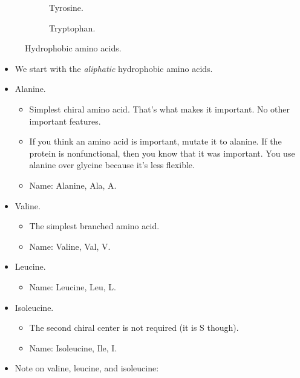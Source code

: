 \documentclass[../notes.tex]{subfiles}
\begin{document}
\begin{itemize}
\begin{figure}[H]
\begin{subfigure}[b]{0.3\linewidth}
            \caption{Tyrosine.}
            \label{fig:AAachiralT}
        \end{subfigure}
        \begin{subfigure}[b]{0.25\linewidth}
            \centering
            \caption{Tryptophan.}
            \label{fig:AAachiralW}
        \end{subfigure}
        \caption{Hydrophobic amino acids.}
        \label{fig:AAhydrophobic}
    \end{figure}
    \begin{itemize}
        \item We start with the \emph{aliphatic} hydrophobic amino acids.
        \item Alanine.
        \begin{itemize}
            \item Simplest chiral amino acid. That's what makes it important. No other important features.
            \item If you think an amino acid is important, mutate it to alanine. If the protein is nonfunctional, then you know that it was important. You use alanine over glycine because it's less flexible.
            \item Name: Alanine, Ala, A.
        \end{itemize}
        \item Valine.
        \begin{itemize}
            \item The simplest branched amino acid.
            \item Name: Valine, Val, V.
        \end{itemize}
        \item Leucine.
        \begin{itemize}
            \item Name: Leucine, Leu, L.
        \end{itemize}
        \item Isoleucine.
        \begin{itemize}
            \item The second chiral center is not required (it is S though).
            \item Name: Isoleucine, Ile, I.
        \end{itemize}
        \item Note on valine, leucine, and isoleucine:

\end{itemize}
\end{itemize}
\end{document}
